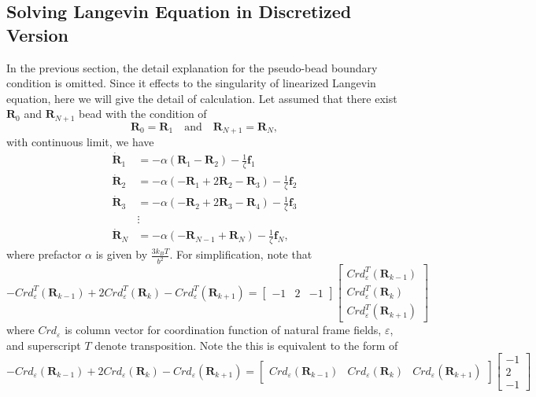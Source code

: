 \documentclass[10pt, a4paper]{article}
\begin{document}
\subsection{Solving Langevin Equation in Discretized Version}
In the previous section, the detail explanation for the pseudo-bead boundary condition is omitted. Since it effects to the singularity of linearized Langevin equation, here we will give the detail of calculation. Let assumed that there exist $\mathbf{R}_0$ and $\mathbf{R}_{N+1}$ bead with the condition of
\begin{equation}
\mathbf{R}_0 = \mathbf{R}_1\quad\textrm{and}\quad\mathbf{R}_{N+1}=\mathbf{R}_{N},
\end{equation}
with continuous limit, we have
\begin{align}
\dot{\mathbf{R}}_1 &= -\alpha \left(\mathbf{R}_1 - \mathbf{R}_2\right) - \frac{1}{\zeta}\mathbf{f}_1 \\
\dot{\mathbf{R}}_2 &= -\alpha \left(-\mathbf{R}_1 + 2\mathbf{R}_2 - \mathbf{R}_3\right) - \frac{1}{\zeta}\mathbf{f}_2 \\
\dot{\mathbf{R}}_3 &= -\alpha \left(-\mathbf{R}_2 + 2\mathbf{R}_3 - \mathbf{R}_4\right) - \frac{1}{\zeta}\mathbf{f}_3 \\
&\vdots\\
\dot{\mathbf{R}}_N &= -\alpha \left(-\mathbf{R}_{N-1} + \mathbf{R}_N\right) - \frac{1}{\zeta}\mathbf{f}_N,
\end{align}
where prefactor $\alpha$ is given by $\frac{3k_BT}{b^2}$.
For simplification, note that
\begin{equation}
-Crd_\varepsilon^T(\mathbf{R}_{k-1}) + 2Crd_\varepsilon^T(\mathbf{R}_k) - Crd_\varepsilon^T(\mathbf{R}_{k+1}) = \left[\begin{array}{ccc}-1 & 2 & -1\end{array}\right]\left[\begin{array}{c}Crd_\varepsilon^T(\mathbf{R}_{k-1})\\ \hline Crd_\varepsilon^T(\mathbf{R}_{k})\\ \hline Crd_\varepsilon^T(\mathbf{R}_{k+1})\end{array}\right]
\end{equation}
where $Crd_\varepsilon$ is column vector for coordination function of natural frame fields, $\varepsilon$, and superscript $T$ denote transposition. Note the this is equivalent to the form of
\begin{equation}
-Crd_\varepsilon(\mathbf{R}_{k-1}) + 2Crd_\varepsilon(\mathbf{R}_k) - Crd_\varepsilon(\mathbf{R}_{k+1}) = \left[\begin{array}{c|c|c}Crd_\varepsilon(\mathbf{R}_{k-1})&Crd_\varepsilon(\mathbf{R}_{k})&Crd_\varepsilon(\mathbf{R}_{k+1})\end{array}\right]\left[\begin{array}{c}-1 \\ 2 \\ -1\end{array}\right]
\end{equation}
\end{document}
